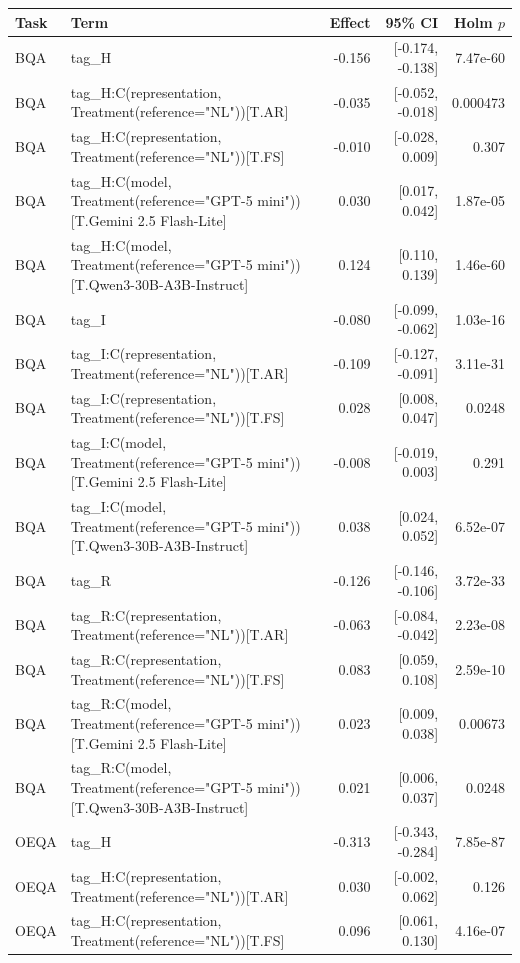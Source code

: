 \begin{tabular}{llrrr}
\toprule
Task & Term & Effect & 95\% CI & Holm $p$ \\
\midrule
BQA & tag\_H & -0.156 & [-0.174, -0.138] & 7.47e-60 \\
BQA & tag\_H:C(representation, Treatment(reference="NL"))[T.AR] & -0.035 & [-0.052, -0.018] & 0.000473 \\
BQA & tag\_H:C(representation, Treatment(reference="NL"))[T.FS] & -0.010 & [-0.028, 0.009] & 0.307 \\
BQA & tag\_H:C(model, Treatment(reference="GPT-5 mini"))[T.Gemini 2.5 Flash-Lite] & 0.030 & [0.017, 0.042] & 1.87e-05 \\
BQA & tag\_H:C(model, Treatment(reference="GPT-5 mini"))[T.Qwen3-30B-A3B-Instruct] & 0.124 & [0.110, 0.139] & 1.46e-60 \\
BQA & tag\_I & -0.080 & [-0.099, -0.062] & 1.03e-16 \\
BQA & tag\_I:C(representation, Treatment(reference="NL"))[T.AR] & -0.109 & [-0.127, -0.091] & 3.11e-31 \\
BQA & tag\_I:C(representation, Treatment(reference="NL"))[T.FS] & 0.028 & [0.008, 0.047] & 0.0248 \\
BQA & tag\_I:C(model, Treatment(reference="GPT-5 mini"))[T.Gemini 2.5 Flash-Lite] & -0.008 & [-0.019, 0.003] & 0.291 \\
BQA & tag\_I:C(model, Treatment(reference="GPT-5 mini"))[T.Qwen3-30B-A3B-Instruct] & 0.038 & [0.024, 0.052] & 6.52e-07 \\
BQA & tag\_R & -0.126 & [-0.146, -0.106] & 3.72e-33 \\
BQA & tag\_R:C(representation, Treatment(reference="NL"))[T.AR] & -0.063 & [-0.084, -0.042] & 2.23e-08 \\
BQA & tag\_R:C(representation, Treatment(reference="NL"))[T.FS] & 0.083 & [0.059, 0.108] & 2.59e-10 \\
BQA & tag\_R:C(model, Treatment(reference="GPT-5 mini"))[T.Gemini 2.5 Flash-Lite] & 0.023 & [0.009, 0.038] & 0.00673 \\
BQA & tag\_R:C(model, Treatment(reference="GPT-5 mini"))[T.Qwen3-30B-A3B-Instruct] & 0.021 & [0.006, 0.037] & 0.0248 \\
OEQA & tag\_H & -0.313 & [-0.343, -0.284] & 7.85e-87 \\
OEQA & tag\_H:C(representation, Treatment(reference="NL"))[T.AR] & 0.030 & [-0.002, 0.062] & 0.126 \\
OEQA & tag\_H:C(representation, Treatment(reference="NL"))[T.FS] & 0.096 & [0.061, 0.130] & 4.16e-07 \\

\end{tabular}
